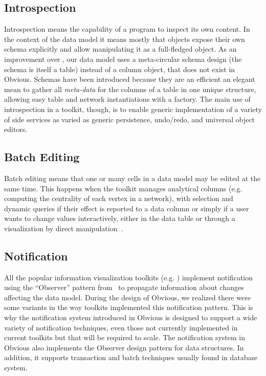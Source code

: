 \subsection{Introspection}

Introspection means the capability of a program to inspect its own
content. In the context of the data model it means mostly that objects
expose their own schema explicitly and allow manipulating it as a
full-fledged object.  As an improvement over \cite{DesignPatternsIV},
our data model uses a meta-circular schema design (the schema is
itself a table) instead of a column object, that does not exist in
Obvious.  Schemas have been introduced because they are an efficient
an elegant mean to gather all \emph{meta-data} for the columns of a
table in one unique structure, allowing easy table and network
instantiations with a factory.  The main use of introspection in a
toolkit, though, is to enable generic implementation of a variety of
side services as varied as generic persistence, undo/redo, and
universal object editors.

\subsection{Batch Editing}

Batch editing means that one or many cells in a data model may be
edited at the same time.  This happens when the toolkit manages
analytical columns (e.g. computing the centrality of each vertex in a
network), with selection and dynamic queries if their effect is
reported to a data column or simply if a user wants to change values
interactively, either in the data table or through a visualization by
direct manipulation~\cite{Discovery3}.

\subsection{Notification}

All the popular information visualization toolkits
(e.g. \cite{Prefuse, InfoVis, jung2003, Discovery1}) implement
notification using the ``Observer'' pattern from~\cite{DesignPatterns}
to propagate information about changes affecting the data model.
During the design of Obvious, we realized there were some variants in
the way toolkits implemented this notification pattern.  This is why
the notification system introduced in Obvious is designed to support a
wide variety of notification techniques, even those not currently
implemented in current toolkits but that will be required to scale.
The notification system in Obvious also implements the Observer design
pattern for data structures.  In addition, it supports transaction and
batch techniques usually found in database system.

